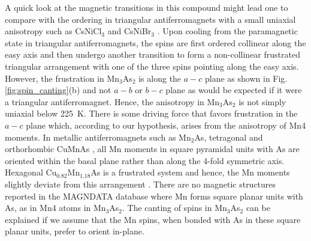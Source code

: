 \documentclass[letterpaper,10pt,doublespacing,edeposit]{uiucthesis2020}
\begin{document}
\begin{mainmatter}
A quick look at the magnetic transitions in this compound might lead one to compare with the ordering in triangular antiferromagnets with a small uniaxial anisotropy such as CsNiCl$_3$ and CsNiBr$_3$ \cite{Collins1997}. Upon cooling from the paramagnetic state in triangular antiferromagnets, the spins are first ordered collinear along the easy axis and then undergo another transition to form a non-collinear frustrated triangular arrangement with one of the three spins pointing along the easy axis. However, the frustration in Mn$_3$As$_2$ is along the $a-c$ plane as shown in Fig. \ref{fig:spin_canting}(b) and not $a-b$ or $b-c$ plane as would be expected if it were a triangular antiferromagnet. Hence, the anisotropy in Mn$_3$As$_2$ is not simply uniaxial below 225~K. There is some driving force that favors frustration in the $a-c$ plane which, according to our hypothesis, arises from the anisotropy of Mn4 moments.
In metallic antiferromagnets such as Mn$_2$As, tetragonal and orthorhombic CuMnAs \cite{Austin1962,MacA2012,Wadley2013}, all Mn moments in square pyramidal units with As are oriented within the basal plane rather than along the 4-fold symmetric axis.
Hexagonal Cu$_{0.82}$Mn$_{1.18}$As is a frustrated system and hence, the Mn moments slightly deviate from this arrangement \cite{Karigerasi2019}.
There are no magnetic structures reported in the MAGNDATA database \cite{Gallego2016_1,Gallego2016_2} where Mn forms square planar units with As, as in Mn4 atoms in Mn$_3$As$_2$. The canting of spins in Mn$_3$As$_2$ can be explained if we assume that the Mn spins, when bonded with As in these square planar units, prefer to orient in-plane.




\end{mainmatter}
\end{document}
